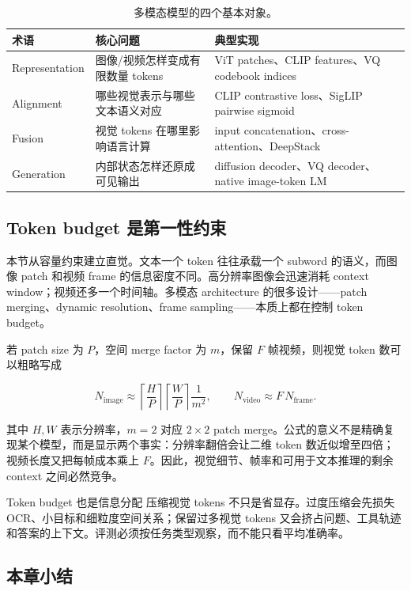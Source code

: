 \documentclass[a4paper]{article}
\begin{document}
\begin{table}[H]
\centering
\begin{tabular}{L{0.19\textwidth}L{0.31\textwidth}L{0.4\textwidth}}
\toprule
术语 & 核心问题 & 典型实现 \\
\midrule
Representation & 图像/视频怎样变成有限数量 tokens & ViT patches、CLIP features、VQ codebook indices \\
Alignment & 哪些视觉表示与哪些文本语义对应 & CLIP contrastive loss、SigLIP pairwise sigmoid \\
Fusion & 视觉 tokens 在哪里影响语言计算 & input concatenation、cross-attention、DeepStack \\
Generation & 内部状态怎样还原成可见输出 & diffusion decoder、VQ decoder、native image-token LM \\
\bottomrule
\end{tabular}
\caption{多模态模型的四个基本对象。}
\end{table}

\subsection{Token budget 是第一性约束}

本节从容量约束建立直觉。文本一个 token 往往承载一个 subword 的语义，而图像 patch 和视频 frame 的信息密度不同。高分辨率图像会迅速消耗 context window；视频还多一个时间轴。多模态 architecture 的很多设计——patch merging、dynamic resolution、frame sampling——本质上都在控制 token budget。

若 patch size 为 $P$，空间 merge factor 为 $m$，保留 $F$ 帧视频，则视觉 token 数可以粗略写成

$$
N_{\mathrm{image}}\approx
\left\lceil\frac{H}{P}\right\rceil
\left\lceil\frac{W}{P}\right\rceil\frac{1}{m^2},
\qquad
N_{\mathrm{video}}\approx F\,N_{\mathrm{frame}}.
$$

其中 $H,W$ 表示分辨率，$m=2$ 对应 $2\times2$ patch merge。公式的意义不是精确复现某个模型，而是显示两个事实：分辨率翻倍会让二维 token 数近似增至四倍；视频长度又把每帧成本乘上 $F$。因此，视觉细节、帧率和可用于文本推理的剩余 context 之间必然竞争。

\begin{warningbox}{Token budget 也是信息分配}
压缩视觉 tokens 不只是省显存。过度压缩会先损失 OCR、小目标和细粒度空间关系；保留过多视觉 tokens 又会挤占问题、工具轨迹和答案的上下文。评测必须按任务类型观察，而不能只看平均准确率。
\end{warningbox}

\subsection{本章小结}
\end{document}
